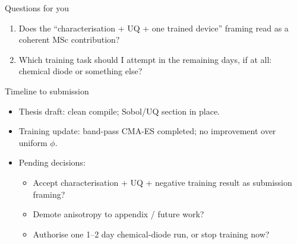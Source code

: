 \documentclass[aspectratio=169,11pt]{beamer}
\begin{document}
\begin{frame}{Questions for you}

\begin{enumerate}
    \item Does the ``characterisation + UQ + one trained device'' framing read as a coherent MSc contribution?
    \item Which training task should I attempt in the remaining days, if at all: chemical diode or something else?
\end{enumerate}

\end{frame}

\begin{frame}{Timeline to submission}

\begin{itemize}
    \item Thesis draft: clean compile; Sobol/UQ section in place.
    \item Training update: band-pass CMA-ES completed; no improvement over uniform $\phi$.
    \item Pending decisions:
    \begin{itemize}
        \item Accept characterisation + UQ + negative training result as submission framing?
        \item Demote anisotropy to appendix / future work?
        \item Authorise one 1--2 day chemical-diode run, or stop training now?
    \end{itemize}
\end{itemize}
\end{frame}
\end{document}
